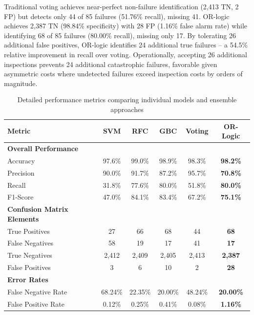 \documentclass[final,5p, twocolumn]{elsarticle}
\begin{document}
Traditional voting achieves near-perfect non-failure identification (2,413 TN, 2 FP) but detects only 44 of 85 failures (51.76\% recall), missing 41. OR-logic achieves 2,387 TN (98.84\% specificity) with 28 FP (1.16\% false alarm rate) while identifying 68 of 85 failures (80.00\% recall), missing only 17. By tolerating 26 additional false positives, OR-logic identifies 24 additional true failures -- a 54.5\% relative improvement in recall over voting. Operationally, accepting 26 additional inspections prevents 24 additional catastrophic failures, favorable given asymmetric costs where undetected failures exceed inspection costs by orders of magnitude.

\begin{table}[htbp]
\centering
\caption{Detailed performance metrics comparing individual models and ensemble approaches}
\label{tab:detailed_metrics}
\begin{tabular}{lccccc}
\hline
\textbf{Metric} & \textbf{SVM} & \textbf{RFC} & \textbf{GBC} & \textbf{Voting} & \textbf{OR-Logic} \\
\hline
\textbf{Overall Performance} & & & & & \\
\quad Accuracy & 97.6\% & 99.0\% & 98.9\% & 98.3\% & \textbf{98.2\%} \\
\quad Precision & 90.0\% & 91.7\% & 87.2\% & 95.7\% & \textbf{70.8\%} \\
\quad Recall & 31.8\% & 77.6\% & 80.0\% & 51.8\% & \textbf{80.0\%} \\
\quad F1-Score & 47.0\% & 84.1\% & 83.4\% & 67.2\% & \textbf{75.1\%} \\
\hline
\textbf{Confusion Matrix Elements} & & & & & \\
\quad True Positives & 27 & 66 & 68 & 44 & \textbf{68} \\
\quad False Negatives & 58 & 19 & 17 & 41 & \textbf{17} \\
\quad True Negatives & 2,412 & 2,409 & 2,405 & 2,413 & \textbf{2,387} \\
\quad False Positives & 3 & 6 & 10 & 2 & \textbf{28} \\
\hline
\textbf{Error Rates} & & & & & \\
\quad False Negative Rate & 68.24\% & 22.35\% & 20.00\% & 48.24\% & \textbf{20.00\%} \\
\quad False Positive Rate & 0.12\% & 0.25\% & 0.41\% & 0.08\% & \textbf{1.16\%} \\
\hline
\end{tabular}
\end{table}
\end{document}
